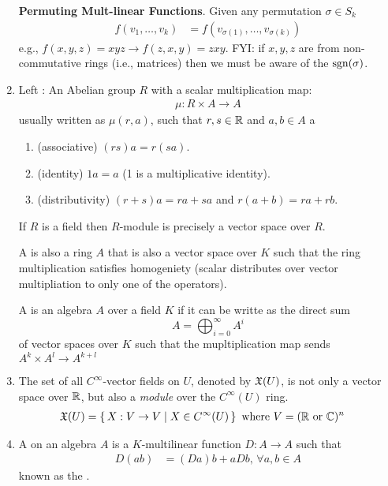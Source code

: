 \documentclass[10pt,a4paper]{report}
\begin{document}
\begin{enumerate}
	\textbf{Permuting Mult-linear Functions}.  Given any permutation $\sigma \in S_k$
	\begin{align*}
		f(v_1, \dots, v_k) &= f(v_{\sigma(1)}, \dots, v_{\sigma(k)})
	\end{align*}e.g., $f(x,y,z) = xyz \to f(z,x,y) = zxy$.  FYI: if $x,y,z$ are from non-commutative rings (i.e., matrices) then we must be aware of the $\operatorname{sgn}(\sigma)$.
	
	\item Left : An Abelian group $R$ with a scalar multiplication map:
	\begin{align*}
		\mu : R \times A \to A
	\end{align*}usually written as $\mu(r,a)$, such that $r,s \in \mathbb{R}$ and $a,b \in A$	 a
	\begin{enumerate}[label=(\roman*)]
		\item (associative) $(rs)a = r(sa)$.
		\item (identity) $1a = a$ (1 is a multiplicative identity).
		\item (distributivity) $(r+s)a = ra+sa$ and $r(a+b) = ra+rb$.	
	\end{enumerate}	 If $R$ is a field then $R$-module is precisely a vector space over $R$.
	
	A  is also a ring $A$ that is also a vector space over $K$ such that the ring multiplication satisfies homogeniety (scalar distributes over vector multipliation to only one of the operators).
	
	A  is an algebra $A$ over a field $K$ if it can be writte as the direct sum $$ A = \bigoplus_{i=0}^\infty A^i$$ of vector spaces over $K$ such that the mupltiplication map sends $A^k \times A^l \to A^{k+l}$
	
	\item The set of all $C^\infty$-vector fields on $U$, denoted by $\mathfrak{X}(U)$, is not only a vector space over $\mathbb{R}$, but also a \textit{module} over the $C^\infty(U)$ ring. \begin{align*}
		\mathfrak{X}(U) &= \left \{\,  X : V \to V \;|\; X \in C^\infty(U) \,\right \} \text{ where } V = (\mathbb{R} \text{ or } \mathbb{C})^n
	\end{align*}
	\item {} A  on an algebra $A$ is a $K$-multilinear function $D:A \to A$ such that 
	\begin{align*}
		D(ab) &= (Da)b+aDb, \, \forall a,b \in A
	\end{align*}known as the .
	

\end{enumerate}
\end{document}
